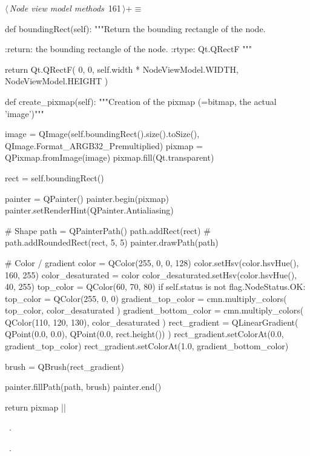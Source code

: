 \documentclass[%
    a4paper,    %
    justified,  %
    nobib,      %
    openany     %
]{tufte-book}
\begin{document}
\begin{flushleft} \small
\begin{minipage}{\linewidth}\label{scrap191}\raggedright\small
{} $\langle\,${\itshape Node view model methods}\nobreak\ {\footnotesize {161}}$\,\rangle+\equiv$
\vspace{-1ex}
\begin{pythoncode}
def boundingRect(self):
    """Return the bounding rectangle of the node.

    :return: the bounding rectangle of the node.
    :rtype: Qt.QRectF
    """

    return Qt.QRectF(
        0, 0, self.width * NodeViewModel.WIDTH, NodeViewModel.HEIGHT
    )

def create_pixmap(self):
    """Creation of the pixmap (=bitmap, the actual 'image')"""

    image = QImage(self.boundingRect().size().toSize(),
                    QImage.Format_ARGB32_Premultiplied)
    pixmap = QPixmap.fromImage(image)
    pixmap.fill(Qt.transparent)

    rect = self.boundingRect()

    painter = QPainter()
    painter.begin(pixmap)
    painter.setRenderHint(QPainter.Antialiasing)

    # Shape
    path = QPainterPath()
    path.addRect(rect)
    # path.addRoundedRect(rect, 5, 5)
    painter.drawPath(path)

    # Color / gradient
    color = QColor(255, 0, 0, 128)
    color.setHsv(color.hsvHue(), 160, 255)
    color_desaturated = color
    color_desaturated.setHsv(color.hsvHue(), 40, 255)
    top_color = QColor(60, 70, 80)
    if self.status is not flag.NodeStatus.OK:
        top_color = QColor(255, 0, 0)
    gradient_top_color = cmn.multiply_colors(
        top_color, color_desaturated
    )
    gradient_bottom_color = cmn.multiply_colors(
        QColor(110, 120, 130), color_desaturated
    )
    rect_gradient = QLinearGradient(
        QPoint(0.0, 0.0), QPoint(0.0, rect.height())
    )
    rect_gradient.setColorAt(0.0, gradient_top_color)
    rect_gradient.setColorAt(1.0, gradient_bottom_color)

    brush = QBrush(rect_gradient)

    painter.fillPath(path, brush)
    painter.end()

    return pixmap
|\NWsep|
\end{pythoncode}
\vspace{1.5ex}
\footnotesize
\begin{list}{}{\setlength{\itemsep}{-\parsep}\setlength{\itemindent}{-\leftmargin}}
\item \NWtxtMacroDefBy\ .
\item \NWtxtMacroRefIn\ .

\item{}
\end{list}
\end{minipage}\vspace{4ex}
\end{flushleft}
\end{document}
